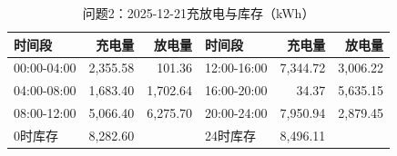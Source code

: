 \begin{table}[H]\centering\small\caption{问题2：2025-12-21充放电与库存（kWh）}\label{tab:q220251221b}
\begin{tabular}{lrrlrr}\toprule
时间段 & 充电量 & 放电量 & 时间段 & 充电量 & 放电量\\\midrule
00:00-04:00 & 2,355.58 & 101.36 & 12:00-16:00 & 7,344.72 & 3,006.22\\
04:00-08:00 & 1,683.40 & 1,702.64 & 16:00-20:00 & 34.37 & 5,635.15\\
08:00-12:00 & 5,066.40 & 6,275.70 & 20:00-24:00 & 7,950.94 & 2,879.45\\
0时库存 & 8,282.60 &  & 24时库存 & 8,496.11 & \\
\bottomrule\end{tabular}\end{table}
